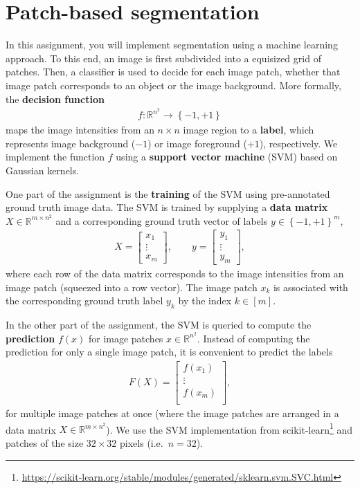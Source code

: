\documentclass[12pt,a4paper]{article}
\begin{document}
\section{Patch-based segmentation}
\label{task:svm_segm}

In this assignment, you will implement segmentation using a machine learning approach. To this end, an image is first subdivided into a equisized grid of patches. Then, a classifier is used to decide for each image patch, whether that image patch corresponds to an object or the image background. More formally, the \textbf{decision function}
\begin{gather*}
    f : \mathbb R^{n^2} \to \left\{-1,+1\right\}
\end{gather*}
maps the image intensities from an $n \times n$ image region to a \textbf{label}, which represents image background ($-1$) or image foreground ($+1$), respectively. We implement the function $f$ using a \textbf{support vector machine} (SVM) based on Gaussian kernels.

One part of the assignment is the \textbf{training} of the SVM using pre-annotated ground truth image data. The SVM is trained by supplying a \textbf{data matrix} $X \in \mathbb R^{m \times n^2}$ and a corresponding ground truth vector of labels $y \in \left\{-1,+1\right\}^m$,
\begin{gather*}
    X = \begin{bmatrix}
        x_1 \\
        \vdots \\
        x_m
    \end{bmatrix}, \qquad
    y = \begin{bmatrix}
        y_1 \\
        \vdots \\
        y_m
    \end{bmatrix},
\end{gather*}
where each row of the data matrix corresponds to the image intensities from an image patch (squeezed into a row vector). The image patch $x_k$ is associated with the corresponding ground truth label $y_k$ by the index $k \in \left[m\right]$.

In the other part of the assignment, the SVM is queried to compute the \textbf{prediction} $f\left(x\right)$ for image patches $x \in \mathbb R^{n^2}$. Instead of computing the prediction for only a single image patch, it is convenient to predict the labels
\begin{gather*}
    F\left(X\right) = \begin{bmatrix}
        f\left(x_1\right) \\
        \vdots \\
        f\left(x_m\right) \\
    \end{bmatrix},
\end{gather*}
for multiple image patches at once (where the image patches are arranged in a data matrix $X \in \mathbb R^{m \times n^2}$). We use the SVM implementation from scikit-learn\footnote{\url{https://scikit-learn.org/stable/modules/generated/sklearn.svm.SVC.html}} and patches of the size $32 \times 32$ pixels (i.e.\ $n = 32$).
\end{document}
